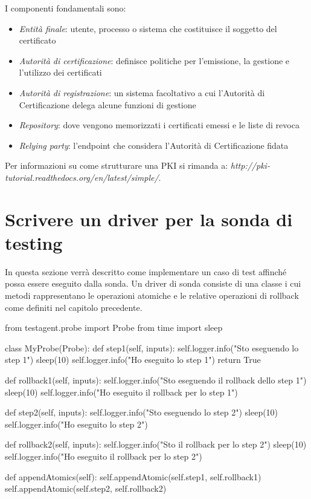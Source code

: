 \documentclass[../main.tex]{subfiles}
\begin{document}
I componenti fondamentali sono:
\begin{itemize}
\item \textit{Entità finale}: utente, processo o sistema che costituisce il soggetto del certificato
\item \textit{Autorità di certificazione}: definisce politiche per l'emissione, la gestione e l'utilizzo dei certificati
\item \textit{Autorità di registrazione}: un sistema facoltativo a cui l'Autorità di Certificazione delega alcune funzioni di gestione
\item \textit{Repository}: dove vengono memorizzati i certificati emessi e le liste di revoca
\item \textit{Relying party}: l'endpoint che considera l'Autorità di Certificazione fidata
\end{itemize}

Per informazioni su come strutturare una PKI si rimanda a: \textit{http://pki-tutorial.readthedocs.org/en/latest/simple/}.

\section {Scrivere un driver per la sonda di testing}
In questa sezione verrà descritto come implementare un caso di test affinché possa essere eseguito dalla sonda.
Un driver di sonda consiste di una classe i cui metodi rappresentano le operazioni atomiche e le relative operazioni di rollback come definiti nel capitolo precedente.
\begin{python}

from testagent.probe import Probe
from time import sleep

class MyProbe(Probe):
    def step1(self, inputs):
        self.logger.info("Sto eseguendo lo step 1")
        sleep(10)
        self.logger.info("Ho eseguito lo step 1")
        return True

    def rollback1(self, inputs):
        self.logger.info("Sto eseguendo il rollback dello step 1")
        sleep(10)
        self.logger.info("Ho eseguito il rollback per lo step 1")

    def step2(self, inputs):
        self.logger.info("Sto eseguendo lo step 2")
        sleep(10)
        self.logger.info("Ho eseguito lo step 2")
        
    def rollback2(self, inputs):
        self.logger.info("Sto il rollback per lo step 2")
        sleep(10)        
        self.logger.info("Ho eseguito il rollback per lo step 2")

    def appendAtomics(self):
        self.appendAtomic(self.step1, self.rollback1)
        self.appendAtomic(self.step2, self.rollback2)
        
\end{python}
\end{document}
